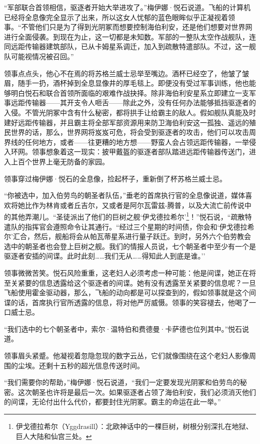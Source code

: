 \documentclass[AutoFakeBold=true]{book}
\begin{document}
``军部联合首领相信，驱逐者开始大举进攻了。''梅伊娜·悦石说道。飞船的计算机已经将全息像完全显示了出来，所以这女人忧郁的蓝色眼眸似乎正凝视着领事。``不管他们只是为了得到光阴冢而想要控制海伯利安，还是他们想要对世界网进行全面侵袭。到现在为止，这一切都是未知数。军部的一整队太空作战舰队，连同远距传输器建筑部队，已从卡姆星系调迁，加入到疏散特遣部队。不过，这一舰队可能视情况被召回。''

领事点点头，他心不在焉的将苏格兰威士忌举至嘴边。酒杯已经空了，他皱了皱眉，随手一扔，酒杯掉到全息显像井的厚毛毯上。即便没有受过军事训练，他也能够明白悦石和联合首领所面临的艰难作战抉择。除非海伯利安星系立即建立一支军事远距传输器——其开支令人咂舌——除此之外，没有任何办法能够抵挡驱逐者的入侵。不管光阴冢中含有什么秘密，都将拱手让给霸主的敌人。假如舰队真能及时建好远距传输器，并且霸主将全部军部资源用来防卫海伯利安这一孤独、遥远的殖民世界的话，那么，世界网将岌岌可危，将会受到驱逐者的攻击，他们可以攻击周界线的任何地方，或者——往更糟的地方想——野蛮人会占领远距传输器，一举侵入环网。领事想象着这一现实：披甲戴盔的驱逐者部队踏进远距传输器传送门，进入上百个世界上毫无防备的家园。

领事穿过梅伊娜·悦石的全息像，捡起杯子，重新倒了杯苏格兰威士忌。

``你被选中，加入伯劳鸟的朝圣者队伍，''垂老的首席执行官的全息像说道，媒体喜欢将她比作为林肯或者丘吉尔，又或者是阿尔瓦雷兹-腾普，以及大流亡前传说中的其他弄潮儿。``圣徒派出了他们的巨树之舰`伊戈德拉希尔'\footnote{伊戈德拉希尔（Yggdrasill）：北欧神话中的一棵巨树，树根分别深扎在地狱、巨人大陆和仙宫三处。}！''悦石说，``疏散特遣队的指挥官会遵照命令让其通行。``经过三个星期的时间债，你会和`伊戈德拉希尔'汇合，然后，舰船将会从帕瓦蒂星系进行量子跃迁。到时，另外六个伯劳教会选中的朝圣者也会登上巨树之舰。我们的情报人员说，七个朝圣者中至少有一个是驱逐者安插的间谍。此时此刻……我们无从……得知此人到底是谁。''

领事微微苦笑。悦石风险重重，这老妇人必须考虑一种可能：他是间谍，她正在将至关紧要的信息透露给这个驱逐者的间谍。她有没有透露至关紧要的信息呢？一旦飞船使用霍金驱动器，那么，飞船的动向都是可以探查到的，假如领事就是这个间谍的话，首席执行官所透露的信息，将对他严厉威慑。领事的笑容褪去，他喝了一口威士忌。

``我们选中的七个朝圣者中，索尔·温特伯和费德曼·卡萨德也位列其中。''悦石说道。

领事眉头紧蹙。他凝视着忽隐忽现的数字云丛，它们就像围绕在这个老妇人影像周围的尘埃。还剩十五秒的超光信息传送时间。

``我们需要你的帮助，''梅伊娜·悦石说道，``我们一定要发现光阴冢和伯劳鸟的秘密。这次朝圣也许将是最后一次。如果驱逐者占领了海伯利安，我们必须消灭他们的间谍，无论付出什么代价，都要封住光阴冢。霸主的命运在此一举。''
\end{document}
